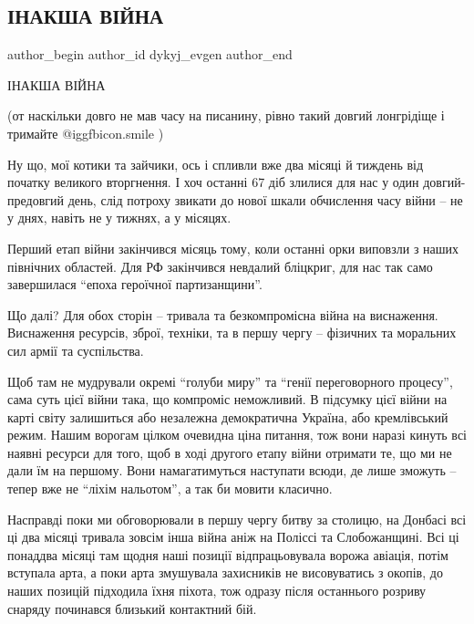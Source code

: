  
 
 
 
 
 
\subsection{ІНАКША ВІЙНА}
\label{sec:01_05_2022.fb.dykyj_evgen.1.inaksha_vijna}
 
\ifcmt
 author_begin
   author_id dykyj_evgen
 author_end
\fi

ІНАКША ВІЙНА

(от наскільки довго не мав часу на писанину, рівно такий довгий лонгрідіще і
тримайте  @igg{fbicon.smile}  )

Ну що, мої котики та зайчики, ось і спливли вже два місяці й тиждень від
початку великого вторгнення. І хоч останні 67 діб злилися для нас у один
довгий-предовгий день, слід потроху звикати до нової шкали обчислення часу
війни – не у днях, навіть не у тижнях, а у місяцях.

Перший етап війни закінчився місяць тому, коли останні орки виповзли з наших
північних областей. Для РФ закінчився невдалий бліцкриг, для нас так само
завершилася \enquote{епоха героїчної партизанщини}.

Що далі? Для обох сторін – тривала та безкомпромісна війна на виснаження.
Виснаження ресурсів, зброї, техніки, та в першу чергу – фізичних та моральних
сил армії та суспільства.

Щоб там не мудрували окремі \enquote{голуби миру} та \enquote{генії переговорного процесу},
сама суть цієї війни така, що компроміс неможливий. В підсумку цієї війни на
карті світу залишиться або незалежна демократична Україна, або кремлівський
режим. Нашим ворогам цілком очевидна ціна питання, тож вони наразі кинуть всі
наявні ресурси для того, щоб в ході другого етапу війни отримати те, що ми не
дали їм на першому. Вони намагатимуться наступати всюди, де лише зможуть –
тепер вже не \enquote{ліхім нальотом}, а так би мовити класично.

Насправді поки ми обговорювали в першу чергу битву за столицю, на Донбасі всі
ці два місяці тривала зовсім інша війна аніж на Поліссі та Слобожанщині. Всі ці
понаддва місяці там щодня наші позиції відпрацьовувала ворожа авіація, потім
вступала арта, а поки арта змушувала захисників не висовуватись з окопів, до
наших позицій підходила їхня піхота, тож одразу після останнього розриву
снаряду починався близький контактний бій. 

